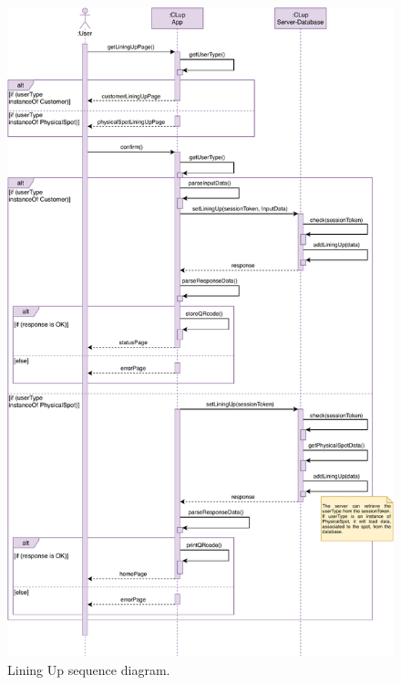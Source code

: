 \begin{figure}[H]
    \centering
    \includegraphics[width=1.0\textwidth]{images/liningUp_sequence_diagram.pdf}
    \caption{Lining Up sequence diagram.}
    \label{figure:liningUpSequenceDiagram}
\end{figure}

